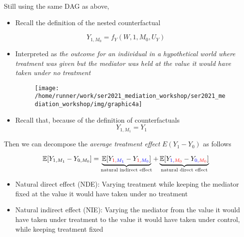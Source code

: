 \documentclass[
  12pt,
]{book}
\providecommand{\tightlist}{%
  \setlength{\itemsep}{0pt}\setlength{\parskip}{0pt}}
\theoremstyle{definition}
\theoremstyle{definition}
\theoremstyle{definition}
\newcommand{\E}{\mathbb{E}}
\newcommand{\1}{\mathbbm{1}}
\begin{document}
Still using the same DAG as above,

\begin{itemize}
\tightlist
\item
  Recall the definition of the nested counterfactual
\end{itemize}

\begin{equation*}
    Y_{1, M_0} = f_Y(W, 1, M_0, U_Y)
\end{equation*}

\begin{itemize}
\item
  Interpreted as \emph{the outcome for an individual in a hypothetical world where
  treatment was given but the mediator was held at the value it would have
  taken under no treatment}

  \begin{figure}

  {\centering \texttt{[image: /home/runner/work/ser2021\_mediation\_workshop/ser2021\_mediation\_workshop/img/graphic4a]} 

  }

  \end{figure}
\item
  Recall that, because of the definition of counterfactuals
  \begin{equation*}
  Y_{1, M_1} = Y_1
  \end{equation*}
\end{itemize}

Then we can decompose the \emph{average treatment effect} \(E(Y_1-Y_0)\) as follows

\begin{equation*}
\E[Y_{1,M_1} - Y_{0,M_0}] = \underbrace{\E[Y_{\color{red}{1},\color{blue}{M_1}} -
    Y_{\color{red}{1},\color{blue}{M_0}}]}_{\text{natural indirect effect}} +
    \underbrace{\E[Y_{\color{blue}{1},\color{red}{M_0}} -
    Y_{\color{blue}{0},\color{red}{M_0}}]}_{\text{natural direct effect}}
\end{equation*}

\begin{itemize}
\tightlist
\item
  Natural direct effect (NDE): Varying treatment while keeping the mediator
  fixed at the value it would have taken under no treatment
\item
  Natural indirect effect (NIE): Varying the mediator from the value it would
  have taken under treatment to the value it would have taken under control,
  while keeping treatment fixed
\end{itemize}
\end{document}

